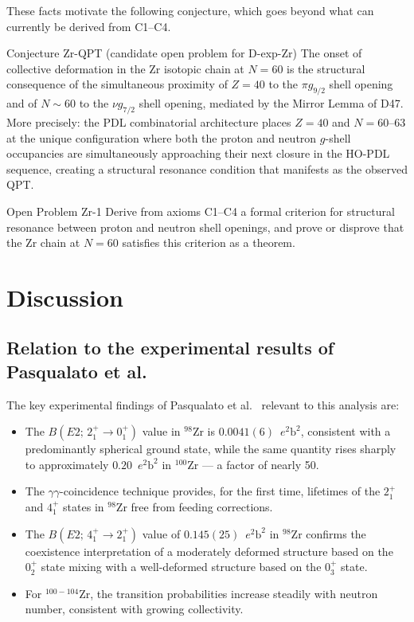 \documentclass[11pt,a4paper]{article}
\theoremstyle{definition}
\theoremstyle{remark}
\begin{document}
These facts motivate the following conjecture, which goes beyond what can currently be derived from C1--C4.

\begin{pdlconjecture}{Conjecture Zr-QPT (candidate open problem for D-exp-Zr)}
The onset of collective deformation in the Zr isotopic chain at $N=60$ is the structural consequence of the simultaneous proximity of $Z=40$ to the $\pi g_{9/2}$ shell opening and of $N \sim 60$ to the $\nu g_{7/2}$ shell opening, mediated by the Mirror Lemma of D47. More precisely: the PDL combinatorial architecture places $Z=40$ and $N=60$--63 at the unique configuration where both the proton and neutron $g$-shell occupancies are simultaneously approaching their next closure in the HO-PDL sequence, creating a structural resonance condition that manifests as the observed QPT.
\end{pdlconjecture}

\begin{pdlopen}{Open Problem Zr-1}
Derive from axioms C1--C4 a formal criterion for structural resonance between proton and neutron shell openings, and prove or disprove that the Zr chain at $N=60$ satisfies this criterion as a theorem.
\end{pdlopen}

\section{Discussion}
\label{sec:discussion}

\subsection{Relation to the experimental results of Pasqualato et al.}

The key experimental findings of Pasqualato et al.~\cite{Pasqualato_2024} relevant to this analysis are:

\begin{itemize}
  \item The $B(E2;\,2^+_1 \to 0^+_1)$ value in $^{98}$Zr is $0.0041(6)$~$e^2\mathrm{b}^2$, consistent with a predominantly spherical ground state, while the same quantity rises sharply to approximately $0.20$~$e^2\mathrm{b}^2$ in $^{100}$Zr --- a factor of nearly 50.
  \item The $\gamma\gamma$-coincidence technique provides, for the first time, lifetimes of the $2^+_1$ and $4^+_1$ states in $^{98}$Zr free from feeding corrections.
  \item The $B(E2;\,4^+_1 \to 2^+_1)$ value of $0.145(25)$~$e^2\mathrm{b}^2$ in $^{98}$Zr confirms the coexistence interpretation of a moderately deformed structure based on the $0^+_2$ state mixing with a well-deformed structure based on the $0^+_3$ state.
  \item For $^{100-104}$Zr, the transition probabilities increase steadily with neutron number, consistent with growing collectivity.
\end{itemize}
\end{document}
